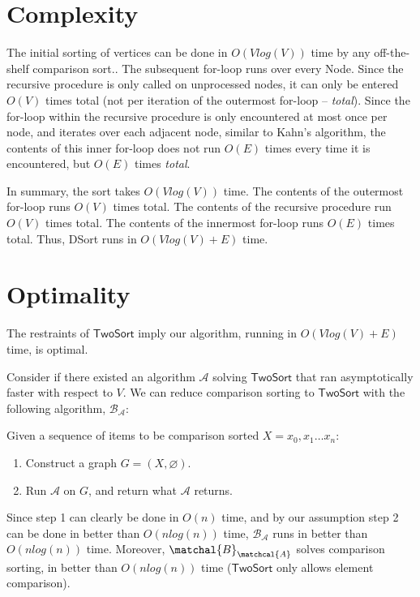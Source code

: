 \documentclass{article}
\newcommand{\sort}{$\mathsf{TwoSort}$ }
\begin{document}
\section*{Complexity}

The initial sorting of vertices can be done in $O(Vlog(V))$ time by any off-the-shelf comparison sort..  The subsequent for-loop runs over every Node.
Since the recursive procedure is only called on unprocessed nodes, it can only be entered $O(V)$ times total (not per iteration of the outermost for-loop -- \textit{total}).
Since the for-loop within the recursive procedure is only encountered at most once per node, and iterates over each adjacent node, similar to Kahn's algorithm, the contents of this inner for-loop does not run $O(E)$ times every time it is encountered, but $O(E)$ times \textit{total}.
\bigskip

In summary, the sort takes $O(Vlog(V))$ time.  The contents of the outermost for-loop runs $O(V)$ times total.  The contents of the recursive procedure run $O(V)$ times total.  The contents of the innermost for-loop runs $O(E)$ times total.  Thus, DSort runs in $O(Vlog(V) + E)$ time.
\bigskip

\section*{Optimality}

The restraints of \sort imply our algorithm, running in $O(Vlog(V) + E)$ time, is optimal.

Consider if there existed an algorithm $\mathcal{A}$ solving \sort that ran asymptotically faster with respect to $V$.  We can reduce comparison sorting to \sort with the following algorithm, $\mathcal{B}_\mathcal{A}$:

\bigskip
Given a sequence of items to be comparison sorted $X = x_0, x_1 \hdots x_n$:
\begin{enumerate}
  \item Construct a graph $G=(X, \varnothing)$.
  \item Run $\mathcal{A}$ on $G$, and return what $\mathcal{A}$ returns.
\end{enumerate}
\bigskip
Since step 1 can clearly be done in $O(n)$ time, and by our assumption step 2 can be done in better than $O(nlog(n))$ time, $\mathcal{B}_\mathcal{A}$ runs in better than $O(nlog(n))$ time.  Moreover, $\matchal{B}_\matchcal{A}$ solves comparison sorting, in better than $O(nlog(n))$ time (\sort only allows element comparison).
\end{document}

